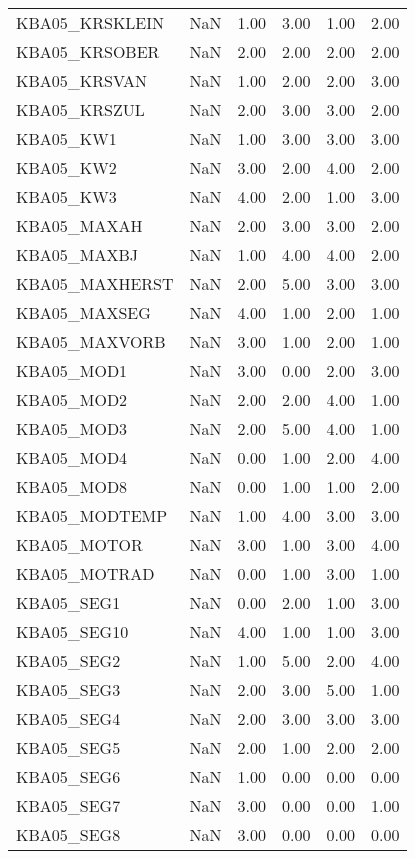 \begin{longtable}{lp{1cm}p{1cm}p{1cm}p{1cm}p{1cm}}
KBA05\_KRSKLEIN   & NaN & 1.00 & 3.00 & 1.00 & 2.00 \\
KBA05\_KRSOBER    & NaN & 2.00 & 2.00 & 2.00 & 2.00 \\
KBA05\_KRSVAN  & NaN & 1.00 & 2.00 & 2.00 & 3.00 \\
KBA05\_KRSZUL  & NaN & 2.00 & 3.00 & 3.00 & 2.00 \\
KBA05\_KW1 & NaN & 1.00 & 3.00 & 3.00 & 3.00 \\
KBA05\_KW2 & NaN & 3.00 & 2.00 & 4.00 & 2.00 \\
KBA05\_KW3 & NaN & 4.00 & 2.00 & 1.00 & 3.00 \\
KBA05\_MAXAH & NaN & 2.00 & 3.00 & 3.00 & 2.00 \\
KBA05\_MAXBJ & NaN & 1.00 & 4.00 & 4.00 & 2.00 \\
KBA05\_MAXHERST   & NaN & 2.00 & 5.00 & 3.00 & 3.00 \\
KBA05\_MAXSEG  & NaN & 4.00 & 1.00 & 2.00 & 1.00 \\
KBA05\_MAXVORB    & NaN & 3.00 & 1.00 & 2.00 & 1.00 \\
KBA05\_MOD1 & NaN & 3.00 & 0.00 & 2.00 & 3.00 \\
KBA05\_MOD2 & NaN & 2.00 & 2.00 & 4.00 & 1.00 \\
KBA05\_MOD3 & NaN & 2.00 & 5.00 & 4.00 & 1.00 \\
KBA05\_MOD4 & NaN & 0.00 & 1.00 & 2.00 & 4.00 \\
KBA05\_MOD8 & NaN & 0.00 & 1.00 & 1.00 & 2.00 \\
KBA05\_MODTEMP    & NaN & 1.00 & 4.00 & 3.00 & 3.00 \\
KBA05\_MOTOR & NaN & 3.00 & 1.00 & 3.00 & 4.00 \\
KBA05\_MOTRAD  & NaN & 0.00 & 1.00 & 3.00 & 1.00 \\
KBA05\_SEG1 & NaN & 0.00 & 2.00 & 1.00 & 3.00 \\
KBA05\_SEG10 & NaN & 4.00 & 1.00 & 1.00 & 3.00 \\
KBA05\_SEG2 & NaN & 1.00 & 5.00 & 2.00 & 4.00 \\
KBA05\_SEG3 & NaN & 2.00 & 3.00 & 5.00 & 1.00 \\
KBA05\_SEG4 & NaN & 2.00 & 3.00 & 3.00 & 3.00 \\
KBA05\_SEG5 & NaN & 2.00 & 1.00 & 2.00 & 2.00 \\
KBA05\_SEG6 & NaN & 1.00 & 0.00 & 0.00 & 0.00 \\
KBA05\_SEG7 & NaN & 3.00 & 0.00 & 0.00 & 1.00 \\
KBA05\_SEG8 & NaN & 3.00 & 0.00 & 0.00 & 0.00 \\

\end{longtable}
